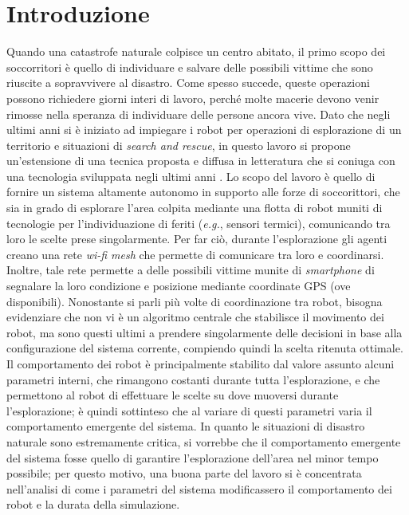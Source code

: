 \chapter{Introduzione}
\label{introduction}
Quando una catastrofe naturale colpisce un centro abitato, il primo scopo dei soccorritori è quello di individuare e salvare delle possibili vittime che sono riuscite a sopravvivere al disastro.
Come spesso succede, queste operazioni possono richiedere giorni interi di lavoro, perché molte macerie devono venir rimosse nella speranza di individuare delle persone ancora vive.
Dato che negli ultimi anni si è iniziato ad impiegare i robot per operazioni di esplorazione di un territorio e situazioni di \textit{search and rescue}, in questo lavoro si propone un'estensione di una tecnica proposta e diffusa in letteratura \cite{burgard2005} che si coniuga con una tecnologia sviluppata negli ultimi anni \cite{OWL}.
Lo scopo del lavoro è quello di fornire un sistema altamente autonomo in supporto alle forze di soccorittori, che sia in grado di esplorare l'area colpita mediante una flotta di robot muniti di tecnologie per l'individuazione di feriti (\textit{e.g.}, sensori termici), comunicando tra loro le scelte prese singolarmente.
Per far ciò, durante l'esplorazione gli agenti creano una rete \textit{wi-fi mesh} che permette di comunicare tra loro e coordinarsi.
Inoltre, tale rete permette a delle possibili vittime munite di \textit{smartphone} di segnalare la loro condizione e posizione mediante coordinate GPS (ove disponibili).
Nonostante si parli più volte di coordinazione tra robot, bisogna evidenziare che non vi è un algoritmo centrale che stabilisce il movimento dei robot, ma sono questi ultimi a prendere singolarmente delle decisioni in base alla configurazione del sistema corrente, compiendo quindi la scelta ritenuta ottimale.
Il comportamento dei robot è principalmente stabilito dal valore assunto alcuni parametri interni, che rimangono costanti durante tutta l'esplorazione, e che permettono al robot di effettuare le scelte su dove muoversi durante l'esplorazione; è quindi sottinteso che al variare di questi parametri varia il comportamento emergente del sistema.
In quanto le situazioni di disastro naturale sono estremamente critica, si vorrebbe che il comportamento emergente del sistema fosse quello di garantire l'esplorazione dell'area nel minor tempo possibile; per questo motivo, una buona parte del lavoro si è concentrata nell'analisi di come i parametri del sistema modificassero il comportamento dei robot e la durata della simulazione.\\
